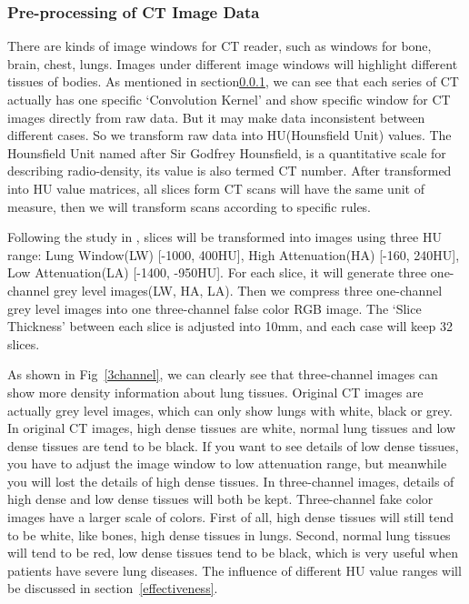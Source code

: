 \subsubsection{Pre-processing of CT Image Data}
\label{ctimagedata}
There are kinds of image windows for CT reader, such as windows for bone, brain, chest, lungs. Images under different image windows will highlight different tissues of bodies.
As mentioned in section\ref{ctimagedata}, we can see that each series of CT actually has one specific `Convolution Kernel' and show specific window for CT images directly from raw data. But it may make data inconsistent between different cases. So we transform raw data into HU(Hounsfield Unit) values. The Hounsfield Unit named after Sir Godfrey Hounsfield, is a quantitative scale for describing radio-density, its value is also termed CT number. After transformed into HU value matrices, all slices form CT scans will have the same unit of measure, then we will transform scans according to specific rules.

Following the study in \cite{Shin2017Three} \cite{gao2018holistic}, slices will be transformed into images using three HU range: Lung Window(LW) [-1000, 400HU], High Attenuation(HA) [-160, 240HU], Low Attenuation(LA) [-1400, -950HU]. 
For each slice, it will generate three one-channel grey level images(LW, HA, LA). Then we compress three one-channel grey level images into one three-channel false color RGB image. The `Slice Thickness' between each slice is adjusted into 10mm, and each case will keep 32 slices.

As shown in Fig~\ref{3channel}, we can clearly see that three-channel images can show more density information about lung tissues. Original CT images are actually grey level images, which can only show lungs with white, black or grey. In original CT images, high dense tissues are white, normal lung tissues and low dense tissues are tend to be black. If you want to see details of low dense tissues, you have to adjust the image window to low attenuation range, but meanwhile you will lost the details of high dense tissues. 
In three-channel images, details of high dense and low dense tissues will both be kept. Three-channel fake color images have a larger scale of colors. First of all, high dense tissues will still tend to be white, like bones, high dense tissues in lungs. Second, normal lung tissues will tend to be red, low dense tissues tend to be black, which is very useful when patients have severe lung diseases.
The influence of different HU value ranges will be discussed in section~\ref{effectiveness}.

